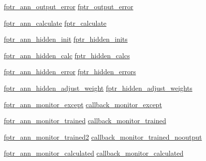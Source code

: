 \begin{DoxyCompactItemize}
\hyperlink{namespacenanai_a5e697a4846a90e7e161e1d2d5be57688}{fptr\+\_\+ann\+\_\+output\+\_\+error} \hyperlink{structnanai_1_1__nanai__ann__nanndesc_af61eea9ccbd8283277d588e551568644}{fptr\+\_\+output\+\_\+error}
\item 
\hyperlink{namespacenanai_ac1a3ebd721fc3cfe1b9accfe7b65b7fe}{fptr\+\_\+ann\+\_\+calculate} \hyperlink{structnanai_1_1__nanai__ann__nanndesc_ad4fee0b24e14e7c5b318f32d796b864d}{fptr\+\_\+calculate}
\item 
\hyperlink{namespacenanai_a5fc4ff646e59919360af1ef410fe9671}{fptr\+\_\+ann\+\_\+hidden\+\_\+init} \hyperlink{structnanai_1_1__nanai__ann__nanndesc_a7b89661da790894a5bddf66df0b0b4b4}{fptr\+\_\+hidden\+\_\+inits}
\item 
\hyperlink{namespacenanai_a299d9093f72831a48d205e94e200690c}{fptr\+\_\+ann\+\_\+hidden\+\_\+calc} \hyperlink{structnanai_1_1__nanai__ann__nanndesc_a41b81f2701d429d961e0034bf84dddfd}{fptr\+\_\+hidden\+\_\+calcs}
\item 
\hyperlink{namespacenanai_aa8cd8d38cbd0a27e2818f132a3cfa2a2}{fptr\+\_\+ann\+\_\+hidden\+\_\+error} \hyperlink{structnanai_1_1__nanai__ann__nanndesc_aaae1bf02f48c4ecdcc1d1edf7c781b4e}{fptr\+\_\+hidden\+\_\+errors}
\item 
\hyperlink{namespacenanai_a1d9a4524c199b1a2891e208ce4b05306}{fptr\+\_\+ann\+\_\+hidden\+\_\+adjust\+\_\+weight} \hyperlink{structnanai_1_1__nanai__ann__nanndesc_a271fc6e0ec04cf3b9e2db7c4754609d7}{fptr\+\_\+hidden\+\_\+adjust\+\_\+weights}
\item 
\hyperlink{namespacenanai_ad9527fac6e647a6c149e4f9a8681e4c1}{fptr\+\_\+ann\+\_\+monitor\+\_\+except} \hyperlink{structnanai_1_1__nanai__ann__nanndesc_a9a0e18b816789572937a49aaecee6a60}{callback\+\_\+monitor\+\_\+except}
\item 
\hyperlink{namespacenanai_adb209ab120b98e800db2b0c8621cd488}{fptr\+\_\+ann\+\_\+monitor\+\_\+trained} \hyperlink{structnanai_1_1__nanai__ann__nanndesc_a1807570e24faaef0b47386133a53d4a2}{callback\+\_\+monitor\+\_\+trained}
\item 
\hyperlink{namespacenanai_a598e872bf861dac8080e98d6d155b3b5}{fptr\+\_\+ann\+\_\+monitor\+\_\+trained2} \hyperlink{structnanai_1_1__nanai__ann__nanndesc_a46db0633c84e04bffed66a2832993f38}{callback\+\_\+monitor\+\_\+trained\+\_\+nooutput}
\item 
\hyperlink{namespacenanai_afc00080af95a1dc2349880f03d7d6a88}{fptr\+\_\+ann\+\_\+monitor\+\_\+calculated} \hyperlink{structnanai_1_1__nanai__ann__nanndesc_a6e0e1cd8cef94d4a1581d1e32265eac3}{callback\+\_\+monitor\+\_\+calculated}

\end{DoxyCompactItemize}
